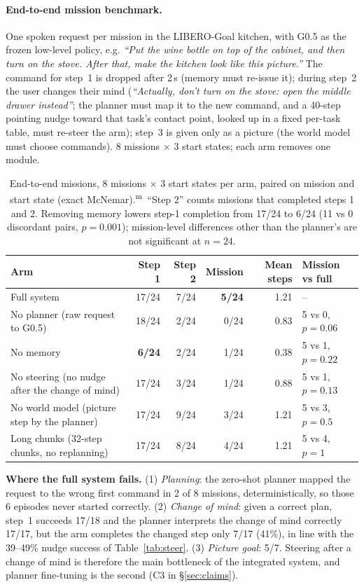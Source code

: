 \documentclass[10pt,a4paper]{article}
\DeclareRobustCommand{\meas}{\textsuperscript{\textcolor{green!50!black}{m}}}
\begin{document}
\paragraph{End-to-end mission benchmark.} One spoken request per mission in the LIBERO-Goal kitchen, with G0.5 as the frozen low-level policy, e.g. \emph{``Put the wine bottle on top of the cabinet, and then turn on the stove. After that, make the kitchen look like this picture.''} The command for step~1 is dropped after 2\,s (memory must re-issue it); during step~2 the user changes their mind (\emph{``Actually, don't turn on the stove: open the middle drawer instead''}; the planner must map it to the new command, and a 40-step pointing nudge toward that task's contact point, looked up in a fixed per-task table, must re-steer the arm); step~3 is given only as a picture (the world model must choose commands). 8 missions $\times$ 3 start states; each arm removes one module.
\begin{table}[H]\centering\small
\begin{tabular}{p{5.0cm}rrrrl}
\toprule
Arm & Step 1 & Step 2 & \textbf{Mission} & Mean steps & Mission vs full \\
\midrule
Full system & 17/24 & 7/24 & \textbf{5/24} & 1.21 & -- \\
No planner (raw request to G0.5) & 18/24 & 2/24 & 0/24 & 0.83 & 5 vs 0, $p=0.06$ \\
No memory & \textbf{6/24} & 2/24 & 1/24 & 0.38 & 5 vs 1, $p=0.22$ \\
No steering (no nudge after the change of mind) & 17/24 & 3/24 & 1/24 & 0.88 & 5 vs 1, $p=0.13$ \\
No world model (picture step by the planner) & 17/24 & 9/24 & 3/24 & 1.21 & 5 vs 3, $p=0.5$ \\
Long chunks (32-step chunks, no replanning) & 17/24 & 8/24 & 4/24 & 1.21 & 5 vs 4, $p=1$ \\
\bottomrule
\end{tabular}
\caption{End-to-end missions, 8 missions $\times$ 3 start states per arm, paired on mission and start state (exact McNemar).\meas\ ``Step 2'' counts missions that completed steps 1 and 2. Removing memory lowers step-1 completion from 17/24 to 6/24 (11 vs 0 discordant pairs, $p=0.001$); mission-level differences other than the planner's are not significant at $n=24$.}
\label{tab:e2e}
\end{table}
\noindent\textbf{Where the full system fails.} (1) \emph{Planning}: the zero-shot planner mapped the request to the wrong first command in 2 of 8 missions, deterministically, so those 6 episodes never started correctly. (2) \emph{Change of mind}: given a correct plan, step~1 succeeds 17/18 and the planner interprets the change of mind correctly 17/17, but the arm completes the changed step only 7/17 (41\%), in line with the 39--49\% nudge success of Table~\ref{tab:steer}. (3) \emph{Picture goal}: 5/7. Steering after a change of mind is therefore the main bottleneck of the integrated system, and planner fine-tuning is the second (C3 in \S\ref{sec:claims}).
\end{document}
